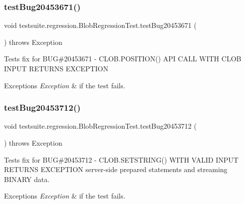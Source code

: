 \subsubsection{\texorpdfstring{test\+Bug20453671()}{testBug20453671()}}
{\footnotesize\ttfamily void testsuite.\+regression.\+Blob\+Regression\+Test.\+test\+Bug20453671 (\begin{DoxyParamCaption}{ }\end{DoxyParamCaption}) throws Exception}

Tests fix for B\+UG\#20453671 -\/ C\+L\+O\+B.\+P\+O\+S\+I\+T\+I\+O\+N() A\+PI C\+A\+LL W\+I\+TH C\+L\+OB I\+N\+P\+UT R\+E\+T\+U\+R\+NS E\+X\+C\+E\+P\+T\+I\+ON


\begin{DoxyExceptions}{Exceptions}
{\em Exception} & if the test fails. \\
\hline
\end{DoxyExceptions}
\mbox{\label{classtestsuite_1_1regression_1_1_blob_regression_test_a044b5dc71a945042d8533a95202d17c4}} 
\subsubsection{\texorpdfstring{test\+Bug20453712()}{testBug20453712()}}
{\footnotesize\ttfamily void testsuite.\+regression.\+Blob\+Regression\+Test.\+test\+Bug20453712 (\begin{DoxyParamCaption}{ }\end{DoxyParamCaption}) throws Exception}

Tests fix for B\+UG\#20453712 -\/ C\+L\+O\+B.\+S\+E\+T\+S\+T\+R\+I\+N\+G() W\+I\+TH V\+A\+L\+ID I\+N\+P\+UT R\+E\+T\+U\+R\+NS E\+X\+C\+E\+P\+T\+I\+ON server-\/side prepared statements and streaming B\+I\+N\+A\+RY data.


\begin{DoxyExceptions}{Exceptions}
{\em Exception} & if the test fails. \\
\hline
\end{DoxyExceptions}
\mbox{\label{classtestsuite_1_1regression_1_1_blob_regression_test_ab579f7995a1a9323124bd8ecff9665c8}} 
